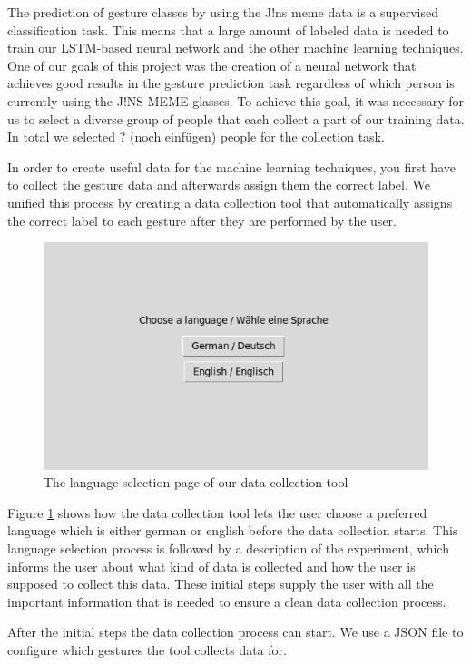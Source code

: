 \documentclass[runningheads]{llncs}
\begin{document}
The prediction of gesture classes by using the J!ns meme data is a supervised classification task. This means that a large amount of labeled data is needed to train our LSTM-based neural network and the other machine learning techniques. One of our goals of this project was the creation of a neural network that achieves good results in the gesture prediction task regardless of which person is currently using the J!NS MEME glasses. To achieve this goal, it was necessary for us to select a diverse group of people that each collect a part of our training data. In total we selected ? (noch einfügen) people for the collection task.
\par
In order to create useful data for the machine learning techniques, you first have to collect the gesture data and afterwards assign them the correct label. We unified this process by creating a data collection tool that automatically assigns the correct label to each gesture after they are performed by the user.
\begin{figure}
\centering
\centerline{\includegraphics[scale=0.5]{Language_Selection.png}}
\caption{The language selection page of our data collection tool}
\label{fig:gesturestart}
\end{figure}
Figure \ref{fig:gesturestart} shows how the data collection tool lets the user choose a preferred language which is either german or english before the data collection starts. This language selection process is followed by a description of the experiment, which informs the user about what kind of data is collected and how the user is supposed to collect this data. These initial steps supply the user with all the important information that is needed to ensure a clean data collection process.
\par
After the initial steps the data collection process can start. We use a JSON file to configure which gestures the tool collects data for. 
\end{document}
